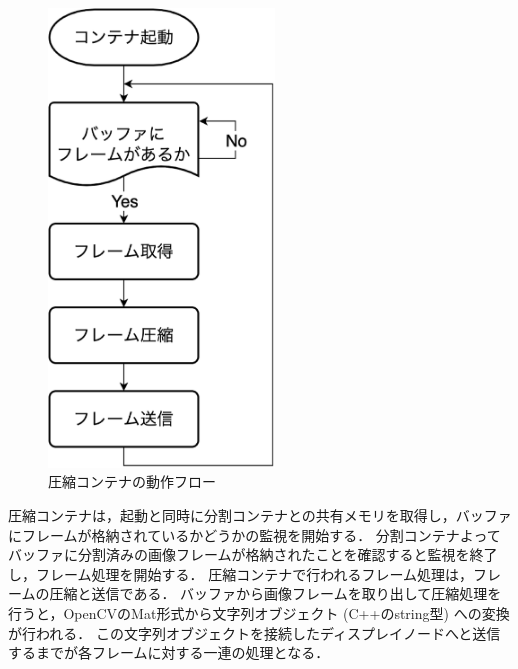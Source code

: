 \begin{figure}[H]
    \hspace*{\fill}
    \includegraphics[width=60mm]{./fig/chap3/assyuku_flow.eps}
    \hspace*{\fill}
    \caption{圧縮コンテナの動作フロー}
\end{figure}
圧縮コンテナは，起動と同時に分割コンテナとの共有メモリを取得し，バッファにフレームが格納されているかどうかの監視を開始する．
分割コンテナよってバッファに分割済みの画像フレームが格納されたことを確認すると監視を終了し，フレーム処理を開始する．
圧縮コンテナで行われるフレーム処理は，フレームの圧縮と送信である．
バッファから画像フレームを取り出して圧縮処理を行うと，OpenCVのMat形式から文字列オブジェクト (C++のstring型) への変換が行われる．
この文字列オブジェクトを接続したディスプレイノードへと送信するまでが各フレームに対する一連の処理となる．

